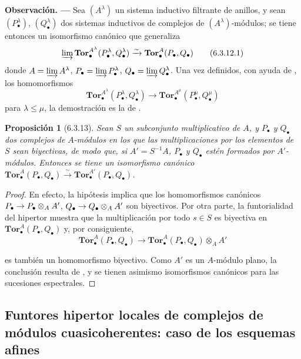 \documentclass[10pt,oneside,openany]{book}
\makeatletter
\theoremstyle{egaenv}\newtheorem*{env}{---}
\theoremstyle{egastatement}
\newtheorem*{proposition}{Proposición}
\theoremstyle{egadescription}
\newenvironment{namedtheorem}[2][]{\par\medskip\noindent\setmanualcurrentlabel{#1}\textbf{#2\ifstrempty{#1}{}{ (#1)}. ---}\ifstrequal{#2}{Observación}{\normalfont}{\ifstrequal{#2}{Observaciones}{\normalfont}{\itshape}}}{\par\medskip}
\newcommand{\oldpage}[2][]{\marginnote{\normalfont\scriptsize\textbf{#1}\,|\,#2}\ignorespaces}
\newcommand{\setmanualcurrentlabel}[1]{\def\@currentlabel{#1}}
\renewcommand{\to}{\mathchoice{\longrightarrow}{\rightarrow}{\rightarrow}{\rightarrow}}
\makeatother
\begin{document}
\begin{namedtheorem}[6.3.12]{Observación}
\label{III.6.3.12}
Sea $(A^\lambda)$ un sistema inductivo filtrante de anillos, y sean
$(P_\bullet^\lambda)$, $(Q_\bullet^\lambda)$ dos sistemas inductivos de
complejos de $(A^\lambda)$-módulos; se tiene entonces un isomorfismo canónico
que generaliza 
\[
  \varinjlim
  \mathbf{Tor}_\bullet^{A^\lambda}
  (P_\bullet^\lambda,Q_\bullet^\lambda)
  \xrightarrow{\sim}
  \mathbf{Tor}_\bullet^A(P_\bullet,Q_\bullet)
  \tag{6.3.12.1}\label{III.6.3.12.1.fr}
\]
donde $A=\varinjlim A^\lambda$, $P_\bullet=\varinjlim P_\bullet^\lambda$,
$Q_\bullet=\varinjlim Q_\bullet^\lambda$. Una vez definidos, con ayuda de
, los homomorfismos
\[
  \mathbf{Tor}_\bullet^{A^\lambda}
  (P_\bullet^\lambda,Q_\bullet^\lambda)
  \longrightarrow
  \mathbf{Tor}_\bullet^{A^\mu}
  (P_\bullet^\mu,Q_\bullet^\mu)
\]
para $\lambda\leqslant\mu$, la demostración es la de .
\end{namedtheorem}

\begin{proposition}[6.3.13]
\label{III.6.3.13}
Sean $S$ un subconjunto multiplicativo de $A$, y $P_\bullet$ y $Q_\bullet$
dos complejos de $A$-módulos en los que las multiplicaciones por los
elementos de $S$ sean biyectivas, de modo que, si $A'=S^{-1}A$,
$P_\bullet$ y $Q_\bullet$ estén formados por $A'$-módulos. Entonces se tiene
un isomorfismo canónico
$\mathbf{Tor}_\bullet^A(P_\bullet,Q_\bullet)
\xrightarrow{\sim}
\mathbf{Tor}_\bullet^{A'}(P_\bullet,Q_\bullet)$.
\end{proposition}

\begin{proof}
En efecto, la hipótesis implica que los homomorfismos canónicos
$P_\bullet\to P_\bullet\otimes_A A'$,
$Q_\bullet\to Q_\bullet\otimes_A A'$ son biyectivos. Por otra parte, la
funtorialidad del hipertor muestra que la multiplicación por todo $s\in S$
es biyectiva en $\mathbf{Tor}_\bullet^A(P_\bullet,Q_\bullet)$ y, por
consiguiente,
\[
  \mathbf{Tor}_\bullet^A(P_\bullet,Q_\bullet)
  \longrightarrow
  \mathbf{Tor}_\bullet^A(P_\bullet,Q_\bullet)\otimes_A A'
\]

\oldpage[III]{146}

es también un homomorfismo biyectivo. Como $A'$ es un $A$-módulo plano, la
conclusión resulta de , y se tienen asimismo isomorfismos
canónicos
para las sucesiones espectrales.
\end{proof}

\subsection{Funtores hipertor locales de complejos de módulos cuasicoherentes: caso de los esquemas afines}
\label{subsection:III.6.4}
\label{III.6.4}
\end{document}
